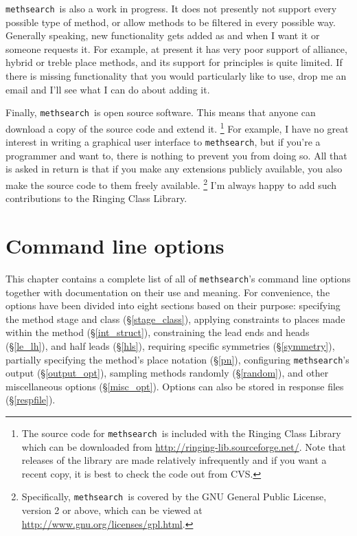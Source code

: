\documentclass[a4paper,11pt,oneside]{book}
\def\methsearch{\texttt{meth\-search}}
\newcommand{\sref}[1]{\hyperref[#1]{\S\ref{#1}}}
\begin{document}
\methsearch\ is also a work in progress.  
It does not presently not support every possible type of method, 
or allow methods to be filtered in every possible way.
Generally speaking, new functionality gets added as and when I want it
or someone requests it.  For example, at present it has very poor support 
of alliance, hybrid or treble place methods,%
and its support for principles
is quite limited.
If there is missing functionality that you would particularly like to use, 
drop me an email and I'll see what I can do about adding it.

Finally, \methsearch\ is open source software.
This means that anyone 
can download a copy of the source code and extend it.%
\footnote{The source code for \methsearch\ is included with the 
Ringing Class Library which can be downloaded from 
\url{http://ringing-lib.sourceforge.net/}.  Note
that releases of the library are made relatively infrequently and if you
want a recent copy, it is best to check the code out from CVS.}
For example, I have no great interest in writing a graphical user interface 
to \methsearch, but if you're a programmer and want to, there is nothing to
prevent you from doing so.  All that is asked in return is that if you
make any extensions publicly available, you also make the source code to them
freely available.%
\footnote{Specifically, \methsearch\ is covered by the GNU General Public 
License, version 2 or above, which can be viewed at
\url{http://www.gnu.org/licenses/gpl.html}.}
I'm always happy to add such contributions to the Ringing Class Library.

\chapter{Command line options}

This chapter contains a complete list of all of \methsearch's command
line options together with documentation on their use and meaning.
For convenience, the options have been divided into eight sections based
on their purpose: specifying the method stage and class (\sref{stage_class}),
applying constraints to places made within the method (\sref{int_struct}),
constraining the lead ends and heads (\sref{le_lh}), and half leads 
(\sref{hls}), requiring specific symmetries (\sref{symmetry}),
partially specifying the method's place notation (\sref{pn}),
configuring \methsearch's output (\sref{output_opt}), sampling methods
randomly (\sref{random}), and other miscellaneous options (\sref{misc_opt}).  
Options can also be stored in response files (\sref{respfile}).
\end{document}
